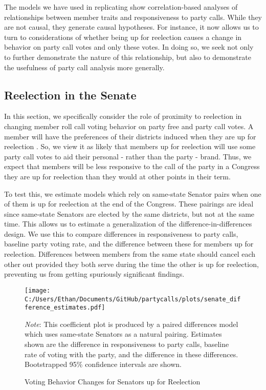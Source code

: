 \documentclass[12pt]{article}
\newcommand\fnote[1]{\captionsetup{font=small}\caption*{#1}}
\begin{document}
The models we have used in replicating \cite{Minozzi:2013} show correlation-based analyses of relationships between member traits and responsiveness to party calls. While they are not causal, they generate causal hypotheses. For instance, it now allows us to turn to considerations of whether being up for reelection causes a change in behavior on party call votes and only these votes. In doing so, we seek not only to further demonstrate the nature of this relationship, but also to demonstrate the usefulness of party call analysis more generally.

\subsection*{Reelection in the Senate}

In this section, we specifically consider the role of proximity to reelection in changing member roll call voting behavior on party free and party call votes. A member will have the preferences of their districts induced when they are up for reelection \cite{Levitt:1996}. So, we view it as likely that members up for reelection will use some party call votes to aid their personal - rather than the party - brand. Thus, we expect that members will be less responsive to the call of the party in a Congress they are up for reelection than they would at other points in their term.

To test this, we estimate models which rely on same-state Senator pairs when one of them is up for reelection at the end of the Congress. These pairings are ideal since same-state Senators are elected by the same districts, but not at the same time. This allows us to estimate a generalization of the difference-in-differences design. We use this to compare differences in responsiveness to party calls, baseline party voting rate, and the difference between these for members up for reelection. Differences between members from the same state should cancel each other out provided they both serve during the time the other is up for reelection, preventing us from getting spuriously significant findings.

\begin{figure}[H]
	\centering
	\caption{Voting Behavior Changes for Senators up for Reelection}
	\texttt{[image: C:/Users/Ethan/Documents/GitHub/partycalls/plots/senate\_difference\_estimates.pdf]}
	\fnote{\textit{Note}: This coefficient plot is produced by a paired differences model which uses same-state Senators as a natural pairing. Estimates shown are the difference in responsiveness to party calls, baseline rate of voting with the party, and the difference in these differences. Bootstrapped 95\% confidence intervals are shown.}
\end{figure}
\end{document}
